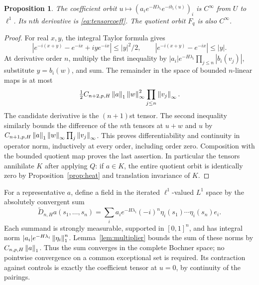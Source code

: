 \documentclass[11pt]{article}
\newtheorem{proposition}[theorem]{Proposition}
\theoremstyle{remark}\newtheorem{remark}[theorem]{Remark}
\begin{document}
\begin{proposition}\label{prop:smooth}
The coefficient orbit $u\mapsto(a_i e^{-H\lambda_i}e^{-ib_i(u)})_i$ is $C^\infty$ from $U$ to $\ell^1$. Its $n$th derivative is \eqref{eq:tensorcoeff}. The quotient orbit $F_q$ is also $C^\infty$.
\end{proposition}
\begin{proof}
For real $x,y$, the integral Taylor formula gives
\[
 |e^{-i(x+y)}-e^{-ix}+iy e^{-ix}|\le |y|^2/2,
 \qquad |e^{-i(x+y)}-e^{-ix}|\le |y|.
\]
At derivative order $n$, multiply the first inequality by $|a_i|e^{-H\lambda_i}\prod_{j\le n}|b_i(v_j)|$, substitute $y=b_i(w)$, and sum. The remainder in the space of bounded $n$-linear maps is at most
\[
 \tfrac12 C_{n+2,p,H}\left\lVert a\right\rVert_1\left\lVert w\right\rVert_\infty^2
        \prod_{j\le n}\left\lVert v_j\right\rVert_\infty.
\]
The candidate derivative is the $(n+1)$st tensor. The second inequality similarly bounds the difference of the $n$th tensors at $u+w$ and $u$ by $C_{n+1,p,H}\left\lVert a\right\rVert_1\left\lVert w\right\rVert_\infty\prod_j\left\lVert v_j\right\rVert_\infty$. This proves differentiability and continuity in operator norm, inductively at every order, including order zero. Composition with the bounded quotient map proves the last assertion. In particular the tensors annihilate $K$ after applying $Q$: if $a\in K$, the entire quotient orbit is identically zero by Proposition~\ref{prop:heat} and translation invariance of $K$.
\end{proof}

For a representative $a$, define a field in the iterated $\ell^1$-valued $L^1$ space by the absolutely convergent sum
\begin{equation}\label{eq:fieldcoeff}
 \widetilde D_{n,H}a(s_1,\ldots,s_n)
 =\sum_i a_i e^{-H\lambda_i}(-i)^n
       \eta_i(s_1)\cdots\eta_i(s_n)e_i.
\end{equation}
Each summand is strongly measurable, supported in $[0,1]^n$, and has integral norm $|a_i|e^{-H\lambda_i}\left\lVert\eta_i\right\rVert_1^n$. Lemma~\ref{lem:multiplier} bounds the sum of these norms by $C_{n,p,H}\left\lVert a\right\rVert_1$. Thus the sum converges in the complete Bochner space; no pointwise convergence on a common exceptional set is required. Its contraction against controls is exactly the coefficient tensor at $u=0$, by continuity of the pairings.
\end{document}
